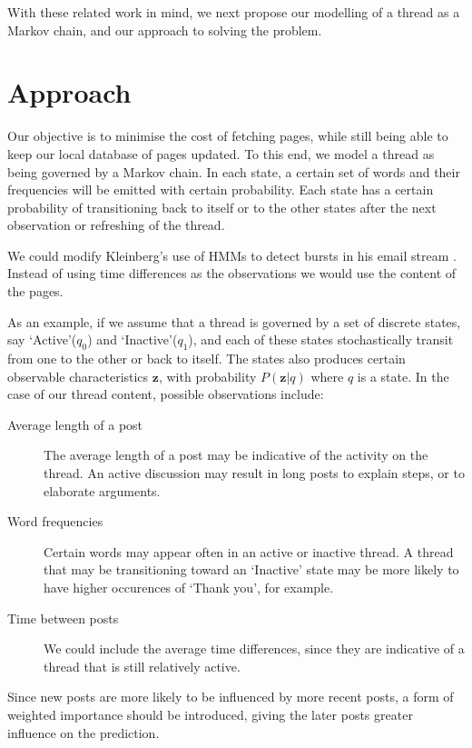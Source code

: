 \documentclass[12 pt]{article}
\begin{document}

With these related work in mind, we next propose our modelling of a thread as a Markov chain, and our approach to solving the problem.

\section{Approach}
Our objective is to minimise the cost of fetching pages, while still being able to keep our local database of pages updated. To this end, we model a thread as being governed by a Markov chain. In each state, a certain set of words and their frequencies will be emitted with certain probability. Each state has a certain probability of transitioning back to itself or to the other states after the next observation or refreshing of the thread.

We could modify Kleinberg's use of HMMs to detect bursts in his email stream \cite{Kleinberg2003}. Instead of using time differences as the observations we would use the content of the pages.

As an example, if we assume that a thread is governed by a set of discrete states, say `Active'($q_0$) and `Inactive'($q_1$), and each of these states stochastically transit from one to the other or back to itself. The states also produces certain observable characteristics $\mathbf{z}$, with probability $P(\mathbf{z}|q)$ where $q$ is a state. In the case of our thread content, possible observations include:
\begin{description}
	\item[Average length of a post] The average length of a post may be indicative of the activity on the thread. An active discussion may result in long posts to explain steps, or to elaborate arguments.
	\item[Word frequencies] Certain words may appear often in an active or inactive thread. A thread that may be transitioning toward an `Inactive' state may be more likely to have higher occurences of `Thank you', for example.
	\item[Time between posts] We could include the average time differences, since they are indicative of a thread that is still relatively active.
\end{description}
Since new posts are more likely to be influenced by more recent posts, a form of weighted importance should be introduced, giving the later posts greater influence on the prediction.
\end{document}
